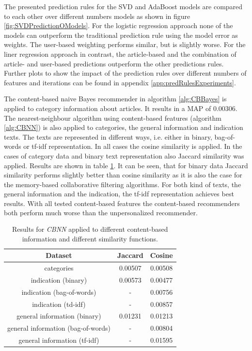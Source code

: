 \documentclass[10pt]{reportMaster}
\begin{document}
The presented prediction rules for the SVD and AdaBoost models are compared to each other over different numbers models as shown in figure \ref{fig:SVDPredictionOModels}. %
For the logistic regression approach none of the models can outperform the traditional prediction rule using the model error as weights.
The user-based weighting performs similar, but is slightly worse.
For the liner regression approach in contrast, the article-based and the combination of article- and user-based predictions outperform the other predictions rules.
Further plots to show the impact of the prediction rules over different numbers of features and iterations can be found in appendix \ref{app:predRulesExperiments}.

The content-based naive Bayes recommender in algorithm \ref{alg:CBBayes} is applied to category information about articles.
It results in a MAP of 0.00306.
The nearest-neighbour algorithm using content-based features (algorithm \ref{alg:CBNN}) is also applied to categories, the general information and indication texts.
The texts are represented in different ways, i.e. either in binary, bag-of-words or tf-idf representation.
In all cases the cosine similarity is applied.
In the cases of category data and binary text representation also Jaccard similarity was applied. 
Results are shown in table \ref{tab:CBNN}.
It can be seen, that for binary data Jaccard similarity performs slightly better than cosine similarity as it is also the case for the memory-based collaborative filtering algorithms.
For both kind of texts, the general information and the indication, the tf-idf representation achieves best results.
With all tested content-based features the content-based recommenders both perform much worse than the unpersonalized recommender.

\begin{table}
\begin{tabular}{|c||c|c|}
	\hline
	\textbf{Dataset}&\textbf{Jaccard}&\textbf{Cosine}\\ \hline
	categories&0.00507&0.00508\\ \hline
	indication (binary)&0.00573&0.00477\\ \hline	
	indication (bag-of-words)&-&0.00756\\ \hline	
	indication (td-idf)&-&0.00857\\ \hline	
	general information (binary)&0.01231&0.01213\\ \hline	
	general information (bag-of-words)&-&0.00804\\ \hline	
	general information (tf-idf)&-&0.01595\\ \hline	
	\end{tabular}
	\caption{Results for \textit{CBNN} applied to different content-based information and different similarity functions.}	
	\label{tab:CBNN}
\end{table}
\end{document}
